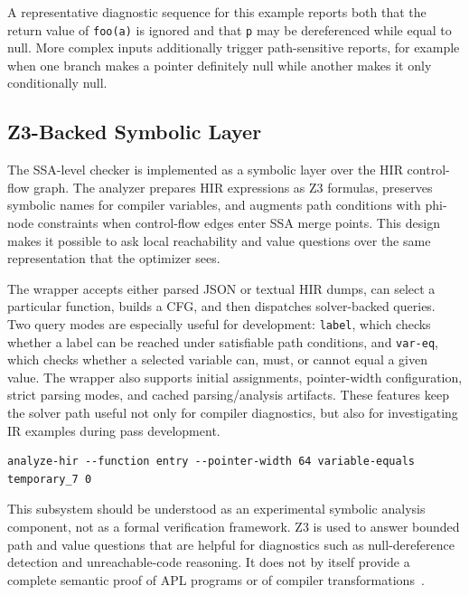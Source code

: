 \documentclass[10pt,twocolumn]{article}
\begin{document}
\par A representative diagnostic sequence for this example reports both that the return value of \texttt{foo(a)} is ignored and that \texttt{p} may be dereferenced while equal to null. More complex inputs additionally trigger path-sensitive reports, for example when one branch makes a pointer definitely null while another makes it only conditionally null.

\subsection{Z3-Backed Symbolic Layer}
\par The SSA-level checker is implemented as a symbolic layer over the HIR control-flow graph. The analyzer prepares HIR expressions as Z3 formulas, preserves symbolic names for compiler variables, and augments path conditions with phi-node constraints when control-flow edges enter SSA merge points. This design makes it possible to ask local reachability and value questions over the same representation that the optimizer sees.
\par The wrapper accepts either parsed JSON or textual HIR dumps, can select a particular function, builds a CFG, and then dispatches solver-backed queries. Two query modes are especially useful for development: \texttt{label}, which checks whether a label can be reached under satisfiable path conditions, and \texttt{var-eq}, which checks whether a selected variable can, must, or cannot equal a given value. The wrapper also supports initial assignments, pointer-width configuration, strict parsing modes, and cached parsing/analysis artifacts. These features keep the solver path useful not only for compiler diagnostics, but also for investigating IR examples during pass development.

\begin{lstlisting}[caption={Representative interface to the symbolic query layer.}]
analyze-hir --function entry --pointer-width 64 variable-equals temporary_7 0
\end{lstlisting}

\par This subsystem should be understood as an experimental symbolic analysis component, not as a formal verification framework. Z3 is used to answer bounded path and value questions that are helpful for diagnostics such as null-dereference detection and unreachable-code reasoning. It does not by itself provide a complete semantic proof of APL programs or of compiler transformations~\cite{deMoura2008z3}.
\end{document}
